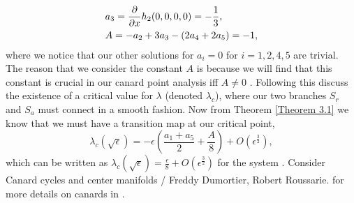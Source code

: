 \begin{subequations}
		\begin{align}
		&a_3=\pd{}{x}h_2(0,0,0,0)=-\frac{1}{3},\\
		&A=-a_2+3a_3-(2a_4+2a_5)=-1,
		\end{align}
\end{subequations}
where we notice that our other solutions for $a_i=0$ for $i=1,2,4,5$ are trivial. The reason that we consider the constant $A$ is because we will find that this constant is crucial in our canard point analysis iff $A\neq 0$ \citep{krupa2001}. Following this \citet{krupa2001} discuss the existence of a critical value for $\lambda$ (denoted $\lambda_c$), where our two branches $S_r$ and $S_a$ must connect in a smooth fashion. Now from Theorem \ref{Theorem 3.1} we know that we must have a transition map at our critical point,
\begin{equation}
\lambda_c(\sqrt{\epsilon})=-\epsilon\left(\frac{a_1+a_5}{2}+\frac{A}{8}\right)+O(\epsilon^\frac{3}{2}),
\end{equation}
which can be written as $\lambda_c(\sqrt{\epsilon})=\frac{\epsilon}{8}+O(\epsilon^\frac{3}{2})$ for the \vdp system \citep{krupa2001}. Consider Canard cycles and center manifolds / Freddy Dumortier, Robert Roussarie. for more details on canards in \vdp.


